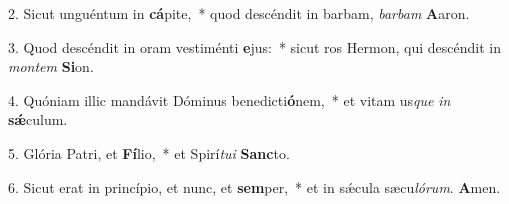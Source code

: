 2. Sicut unguéntum in \textbf{cá}pite,~*  quod descéndit in barbam, \textit{bar}\textit{bam} \textbf{A}aron.\

3. Quod descéndit in oram vestiménti \textbf{e}jus:~*  sicut ros Hermon, qui descéndit in \textit{mon}\textit{tem} \textbf{Si}on.\

4. Quóniam illic mandávit Dóminus benedicti\textbf{ó}nem,~*  et vitam us\textit{que} \textit{in} \textbf{sǽ}culum.\

5. Glória Patri, et \textbf{Fí}lio,~*  et Spirí\textit{tu}\textit{i} \textbf{Sanc}to.\

6. Sicut erat in princípio, et nunc, et \textbf{sem}per,~*  et in sǽcula sæcu\textit{ló}\textit{rum}. \textbf{A}men.\

